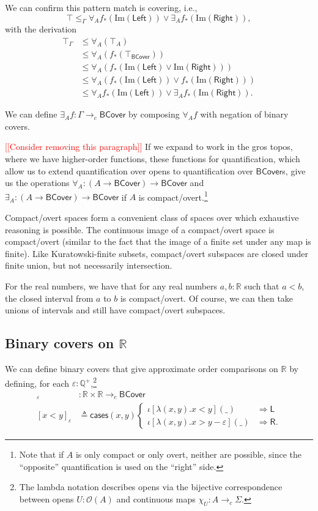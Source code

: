 \documentclass[conference]{IEEEtran}
\newcommand{\cto}{\to_c}
\newcommand{\R}{\mathbb{R}}
\newcommand{\rat}{\mathbb{Q}}
\newcommand{\Open}[1]{\mathcal{O}({#1})}
\newcommand{\wildcard}{\_}
\newcommand{\Img}[1]{\text{Im}\left({#1}\right)}
\newcommand{\oinclf}[1]{\iota[{#1}]}
\newcommand{\oincl}[2]{\oinclf{#1} \left({#2}\right)}
\newcommand{\Branch}{\Rightarrow}
\newcommand{\BCover}{\mathsf{BCover}}
\newcommand{\note}[1]{\textcolor{red}{[[{#1}]]}}
\begin{document}
We can confirm this pattern match is covering, i.e.,
\[
\top \le_\Gamma \forall_A f_*(\Img{\mathsf{Left}}) \vee \exists_A f_*(\Img{\mathsf{Right}}),
\]
with the derivation
\begin{align*}
\top_\Gamma 
  &\le \forall_A (\top_A) \tag{$\forall_A$ adjointness}
\\ &\le \forall_A (f_*(\top_\BCover)) \tag{$f_*$ preserves $\top$}
\\ &\le \forall_A (f_*(\Img{\mathsf{Left}} \vee \Img{\mathsf{Right}}))
\\ &\le \forall_A(f_*(\Img{\mathsf{Left}}) \vee f_*(\Img{\mathsf{Right}}))  \tag{$f_*$ preserves joins}
\\ &\le \forall_A f_*(\Img{\mathsf{Left}}) \vee \exists_A f_*(\Img{\mathsf{Right}}) \tag{$A$ is compact/overt}.
\end{align*}

We can define $\exists_A f : \Gamma \cto \BCover$ by composing $\forall_A f$ with negation of binary covers.

\note{Consider removing this paragraph} If we expand to work in the gros topos, where we have higher-order functions, these functions for quantification, which allow us to extend quantification over opens to quantification over $\BCover$s, give us the operations $\forall_A : (A \to \BCover) \to \BCover$ and $\exists_A : (A \to \BCover) \to \BCover$ if $A$ is compact/overt.\footnote{Note that if $A$ is only compact or only overt, neither are possible, since the ``opposite'' quantification is used on the ``right'' side.}

Compact/overt spaces form a convenient class of spaces over which exhaustive reasoning is possible. The continuous image of a compact/overt space is compact/overt (similar to the fact that the image of a finite set under any map is finite). Like Kuratowski-finite subsets, compact/overt subspaces are closed under finite union, but not necessarily intersection.

For the real numbers, we have that for any real numbers $a, b : \R$ such that $a < b$, the closed interval from $a$ to $b$ is compact/overt. Of course, we can then take unions of intervals and still have compact/overt subspaces.

\subsection{Binary covers on $\R$}

We can define binary covers that give approximate order comparisons on $\R$ by defining, for each $\varepsilon : \rat^+$,\footnote{The lambda notation describes opens via the bijective correspondence between opens $U : \Open{A}$ and continuous maps $\chi_U : A \cto \Sigma$.}
\begin{align*}
[ \cdot < \cdot ]_\varepsilon &: \R \times \R \cto \BCover
\\ [x < y]_\varepsilon &\triangleq \mathsf{cases}(x, y)
\begin{cases}
\oincl{\lambda (x, y). x < y}{\wildcard} &\Branch \mathsf{L}
\\ \oincl{\lambda (x, y). x > y - \varepsilon}{\wildcard} &\Branch \mathsf{R}.
\end{cases}
\end{align*}
\end{document}
